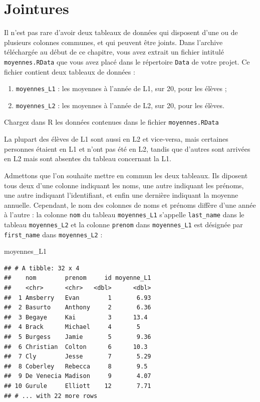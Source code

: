\documentclass[
  11pt,
]{book}
\newenvironment{Shaded}{\begin{snugshade}}{\end{snugshade}}
\newcommand{\NormalTok}[1]{#1}
\providecommand{\tightlist}{%
  \setlength{\itemsep}{0pt}\setlength{\parskip}{0pt}}
\numberwithin{equation}{section}
\numberwithin{countremarque}{section}
\newenvironment{greenbox}{
  \begin{tcolorbox}[breakable, colback=vert,coltext=black,
                  colframe=grisfonce]}
 {\end{tcolorbox}}
\begin{document}
\hypertarget{jointures}{%
\section{Jointures}\label{jointures}}

Il n'est pas rare d'avoir deux tableaux de données qui disposent d'une ou de plusieurs colonnes communes, et qui peuvent être joints. Dans l'archive téléchargée au début de ce chapitre, vous avez extrait un fichier intitulé \texttt{moyennes.RData} que vous avez placé dans le répertoire \texttt{Data} de votre projet. Ce fichier contient deux tableaux de données :

\begin{enumerate}
\def\labelenumi{\arabic{enumi}.}
\tightlist
\item
  \texttt{moyennes\_L1} : les moyennes à l'année de L1, sur 20, pour les élèves ;
\item
  \texttt{moyennes\_L2} : les moyennes à l'année de L2, sur 20, pour les élèves.
\end{enumerate}

\begin{greenbox}
Chargez dans R les données contenues dans le fichier \texttt{moyennes.RData}

\end{greenbox}

La plupart des élèves de L1 sont aussi en L2 et vice-versa, mais certaines personnes étaient en L1 et n'ont pas été en L2, tandis que d'autres sont arrivées en L2 mais sont absentes du tableau concernant la L1.

Admettons que l'on souhaite mettre en commun les deux tableaux. Ils diposent tous deux d'une colonne indiquant les noms, une autre indiquant les prénoms, une autre indiquant l'identifiant, et enfin une dernière indiquant la moyenne annuelle. Cependant, le nom des colonnes de noms et prénoms diffère d'une année à l'autre : la colonne \texttt{nom} du tableau \texttt{moyennes\_L1} s'appelle \texttt{last\_name} dans le tableau \texttt{moyennes\_L2} et la colonne \texttt{prenom} dans \texttt{moyennes\_L1} est désignée par \texttt{first\_name} dans \texttt{moyennes\_L2} :

\begin{Shaded}
\begin{Highlighting}[]
\NormalTok{moyennes\_L1}
\end{Highlighting}
\end{Shaded}

\begin{lstlisting}
## # A tibble: 32 x 4
##    nom        prenom     id moyenne_L1
##    <chr>      <chr>   <dbl>      <dbl>
##  1 Amsberry   Evan        1       6.93
##  2 Basurto    Anthony     2       6.36
##  3 Begaye     Kai         3      13.4 
##  4 Brack      Michael     4       5   
##  5 Burgess    Jamie       5       9.36
##  6 Christian  Colton      6      10.3 
##  7 Cly        Jesse       7       5.29
##  8 Coberley   Rebecca     8       9.5 
##  9 De Venecia Madison     9       4.07
## 10 Gurule     Elliott    12       7.71
## # ... with 22 more rows
\end{lstlisting}
\end{document}
